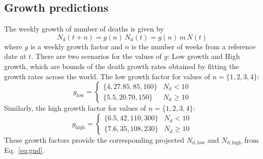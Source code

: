 \documentclass{article}
\newcommand{\nd}{\ensuremath{N_{\mathrm{d}}}}
\newcommand{\ndl}{\ensuremath{N_{\mathrm{d,low}}}}
\newcommand{\ndh}{\ensuremath{N_{\mathrm{d,high}}}}
\begin{document}
\subsection{Growth predictions}
The weekly growth of number of deaths is given by
\begin{equation}
  \label{eq:gnd}
  \nd(t+n) = g(n) \, \nd(t)  = g(n) \, m \, N(t)
\end{equation}
where $g$ is a weekly growth factor and $n$ is the number of weeks
from a reference date at $t$.  There are two scenarios for the values
of $g$: Low growth and High growth, which are bounds of the death
growth rates obtained by fitting the growth rates across the
world\cite{ansualok20}.  The low growth
factor for values of $n = \{1, 2, 3, 4\}$:
\begin{equation}
  g_{\mathrm{low}} = \begin{cases}
   \{4, 27.85, 85, 160\}  & \nd < 10 \\
   \{5.5, 20. 70, 150\} & \nd \geq 10
 \end{cases}
\end{equation}
Similarly, the high growth factor for values of $n = \{1, 2, 3, 4\}$:
\begin{equation}
  g_{\mathrm{high}} = \begin{cases}
   \{6.5, 42, 110, 300\}  & \nd < 10 \\
   \{7.6, 35, 108, 230\} & \nd \geq 10
 \end{cases}
\end{equation}
These growth factors provide the corresponding projected $\ndl$ and $\ndh$ from
Eq.~\eqref{eq:gnd}.





\end{document}
